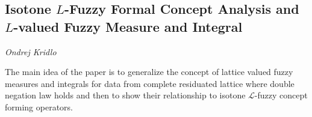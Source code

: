 \documentclass[../booklet.tex]{subfiles}
\begin{document}
\subsection[Isotone $L$-Fuzzy Formal Concept Analysis and $L$-valued Fuzzy Measure and Integral. {\it Ondrej Kridlo}]{Isotone $L$-Fuzzy Formal Concept Analysis and $L$-valued Fuzzy Measure and Integral}

\begin{center}
  {\it Ondrej Kridlo}
\end{center}


\newcommand{\LL}{{\mathcal L}}

The main idea of the paper is to generalize the concept of lattice valued fuzzy measures and integrals for data from complete residuated lattice where double negation law holds and then to show their relationship to isotone $\LL$-fuzzy concept forming operators.
\end{document}
